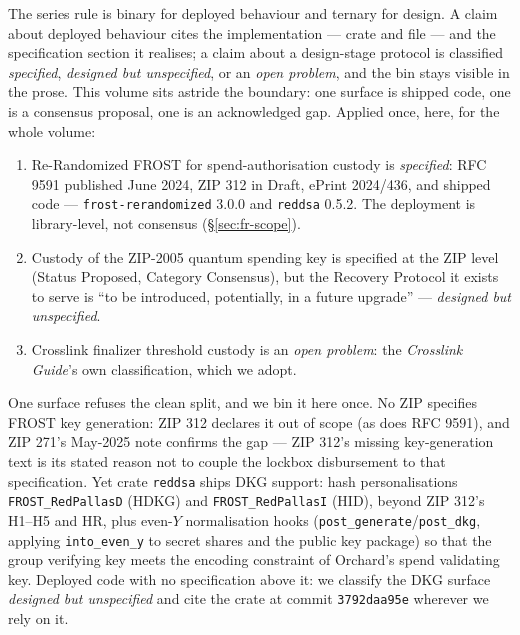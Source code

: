 \documentclass[11pt,a4paper]{article}
\theoremstyle{definition}
\begin{document}
The series rule is binary for deployed behaviour and ternary for design.
A claim about deployed behaviour cites the implementation --- crate and
file --- and the specification section it realises; a claim about a
design-stage protocol is classified \emph{specified}, \emph{designed but
unspecified}, or an \emph{open problem}, and the bin stays visible in the
prose. This volume sits astride the boundary: one surface is shipped
code, one is a consensus proposal, one is an acknowledged gap. Applied
once, here, for the whole volume:
\begin{enumerate}
\item Re-Randomized FROST for spend-authorisation custody is
  \emph{specified}: RFC 9591 published June 2024, ZIP 312 in Draft,
  ePrint 2024/436, and shipped code --- \texttt{frost-rerandomized}
  3.0.0 and \texttt{reddsa} 0.5.2. The deployment is library-level, not
  consensus (\S\ref{sec:fr-scope}).
\item Custody of the ZIP-2005 quantum spending key is specified at the
  ZIP level (Status Proposed, Category Consensus), but the Recovery
  Protocol it exists to serve is ``to be introduced, potentially, in a
  future upgrade'' --- \emph{designed but unspecified}.
\item Crosslink finalizer threshold custody is an \emph{open problem}:
  the \emph{Crosslink Guide}'s own classification, which we adopt.
\end{enumerate}

One surface refuses the clean split, and we bin it here once. No ZIP
specifies FROST key generation: ZIP 312 declares it out of scope (as does
RFC 9591), and ZIP 271's May-2025 note confirms the gap --- ZIP 312's
missing key-generation text is its stated reason not to couple the
lockbox disbursement to that specification. Yet crate \texttt{reddsa}
ships DKG support: hash personalisations \texttt{FROST\_RedPallasD}
(HDKG) and \texttt{FROST\_RedPallasI} (HID), beyond ZIP 312's H1--H5 and
HR, plus even-$Y$ normalisation hooks
(\texttt{post\_generate}/\texttt{post\_dkg}, applying
\texttt{into\_even\_y} to secret shares and the public key package) so
that the group verifying key meets the encoding constraint of Orchard's
spend validating key. Deployed code with no specification above it: we
classify the DKG surface \emph{designed but unspecified} and cite the
crate at commit \texttt{3792daa95e} wherever we rely on it.
\end{document}
